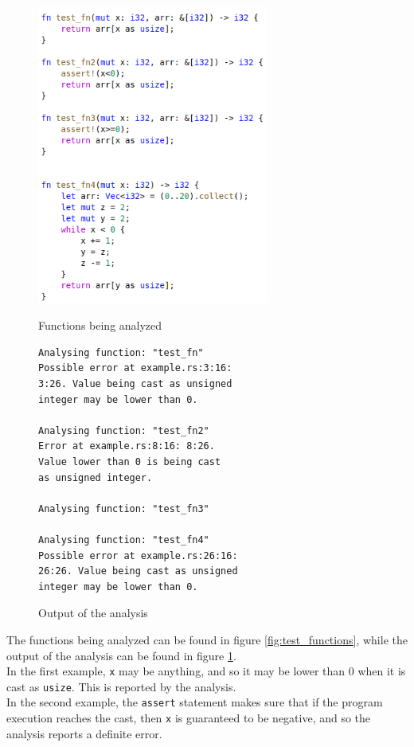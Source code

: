 \documentclass[11pt,a4paper]{article}
\begin{document}
\begin{figure}
    \includegraphics[width=7.6cm]{img/test_functions.png}
    \caption{Functions being analyzed}
    \label{fig:test_functions}

    \vspace{1cm}

    \begin{verbatim}
Analysing function: "test_fn"
Possible error at example.rs:3:16: 
3:26. Value being cast as unsigned 
integer may be lower than 0.

Analysing function: "test_fn2"
Error at example.rs:8:16: 8:26. 
Value lower than 0 is being cast 
as unsigned integer.

Analysing function: "test_fn3"

Analysing function: "test_fn4"
Possible error at example.rs:26:16: 
26:26. Value being cast as unsigned 
integer may be lower than 0.
    \end{verbatim}
    \caption{Output of the analysis}
    \label{fig:analysis_output}
\end{figure}


The functions being analyzed can be found in figure \ref{fig:test_functions}, while
the output of the analysis can be found in figure \ref{fig:analysis_output}.\\

In the first example, \texttt{x} may be anything, and so it may be lower than 0
when it is cast as \texttt{usize}. This is reported by the analysis.\\

In the second example, the \texttt{assert} statement makes sure that if the program
execution reaches the cast, then \texttt{x} is guaranteed to be negative, and so
the analysis reports a definite error.\\
\end{document}
